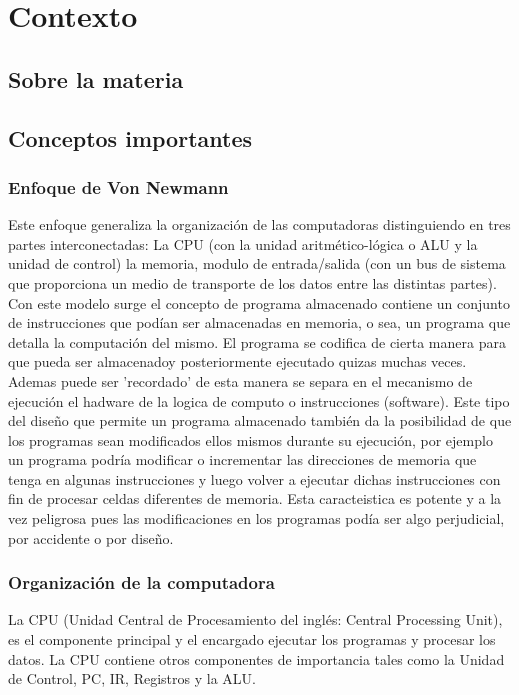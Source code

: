 \chapter{Contexto}
\section{Sobre la materia \orga}
\section{Conceptos importantes}

\subsection{Enfoque de Von Newmann}
Este enfoque generaliza la organización de las computadoras distinguiendo en tres partes interconectadas: La CPU (con la unidad aritmético-lógica o ALU y la unidad de control) la memoria, modulo de entrada/salida (con un bus de sistema que proporciona un medio de transporte de los datos entre las distintas partes). Con este modelo surge el concepto de programa almacenado contiene un conjunto de instrucciones que podían ser almacenadas en memoria, o sea, un programa que detalla la computación del mismo. El programa se codifica de cierta manera para que pueda ser almacenadoy posteriormente ejecutado quizas muchas veces. Ademas puede ser 'recordado' de esta manera se separa en el mecanismo de ejecución el hadware de la logica de computo o instrucciones (software).
Este tipo del diseño que permite un programa almacenado también da la posibilidad de que los programas sean modificados ellos mismos durante su ejecución, por ejemplo un programa podría modificar o incrementar las direcciones de memoria que tenga en algunas instrucciones y luego volver a ejecutar dichas instrucciones con fin de procesar celdas diferentes de memoria. Esta caracteistica es potente y a la vez peligrosa pues las modificaciones en los programas podía ser algo perjudicial, por accidente o por diseño.

\subsection{Organización de la computadora}

La CPU (Unidad Central de Procesamiento del inglés: Central Processing Unit), es el componente principal y el encargado ejecutar los programas y procesar los datos. La CPU contiene otros componentes de importancia tales como la Unidad de Control, PC, IR, Registros y la ALU.

